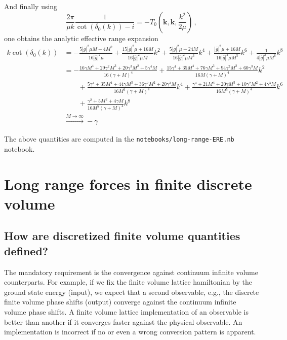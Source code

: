 \documentclass[
    aps,
    prl,
    showkeys,
    nofootinbib,
    floatfix
]{revtex4-1}
\renewcommand{\vec}[1]{\boldsymbol{#1}}
\begin{document}
And finally using 
\begin{equation}
	\frac{2 \pi}{ \mu k } \frac{1}{\cot(\delta_0(k)) - i} = - T_0\left(\vec k, \vec k, \frac{k^2}{2 \mu} \right) \, ,
\end{equation}
one obtains the analytic effective range expansion
\begin{align}
	k \cot( \delta_0(k))
	&=
	-\frac{5 |\bar g|^2 \mu  M-4 M^2}{16 |\bar g|^2 \mu }
	+\frac{15 |\bar g|^2 \mu + 16 M}{16 |\bar g|^2 \mu M}k^2
	+\frac{5 |\bar g|^2 \mu + 24 M}{16 |\bar g|^2\mu  M^3}k^4
	+\frac{|\bar g|^2 \mu + 16 M}{16|\bar g|^2 \mu  M^5}k^6
	+\frac{1}{4 |\bar g|^2 \mu  M^6}k^8
	\\
	&=
	-\frac{16\gamma  M^4+29 \gamma ^2 M^3+20 \gamma ^3 M^2+5 \gamma ^4 M}{16 (\gamma +M)^4}
	+\frac{15 \gamma ^4+35 M^4+76\gamma  M^3+94 \gamma ^2 M^2+60 \gamma ^3 M}{16 M (\gamma +M)^4}k^2
	\\\nonumber&\qquad
	+\frac{5 \gamma ^4+35 M^4+44 \gamma  M^3+36 \gamma ^2 M^2+20\gamma ^3 M}{16 M^3 (\gamma +M)^4}k^4
	+\frac{\gamma ^4+21 M^4+20 \gamma  M^3+10 \gamma ^2 M^2+4 \gamma ^3 M}{16 M^5(\gamma +M)^4}k^6
	\\\nonumber&\qquad
	+ \frac{\gamma ^2+5 M^2+4 \gamma  M}{16 M^5 (\gamma +M)^4}k^8 
	\\&\overset{M\to\infty}{\longrightarrow}-\gamma
\end{align}

The above quantities are computed in the \texttt{notebooks/long-range-ERE.nb} notebook.

\section{Long range forces in finite discrete volume}

\subsection{How are discretized finite volume quantities defined?}

The mandatory requirement is the convergence against continuum infinite volume counterparts.
For example, if we fix the finite volume lattice hamiltonian by the ground state energy (input), we expect that a second observable, e.g., the discrete finite volume phase shifts (output) converge against the continuum infinite volume phase shifts.
A finite volume lattice implementation of an observable is better than another if it converges faster against the physical observable.
An implementation is incorrect if no or even a wrong conversion pattern is apparent.
\end{document}
